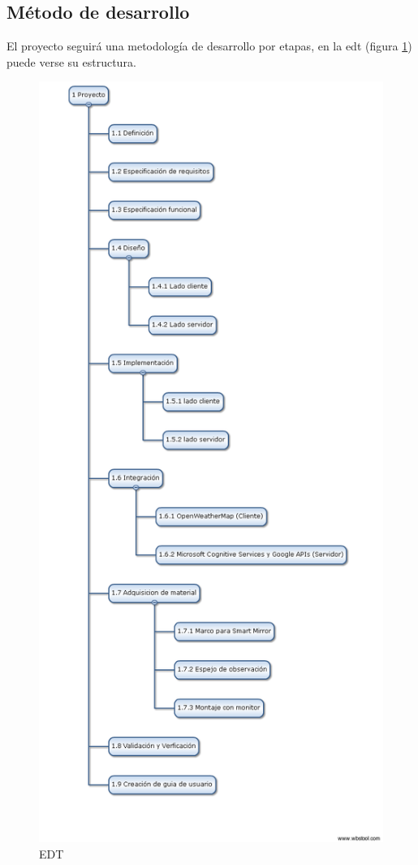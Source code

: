 \subsection{Método de desarrollo}

El proyecto seguirá una metodología de desarrollo por etapas, en la \acrfull{edt} (figura \ref{fig:edt}) puede verse su estructura.

\begin{figure}[!htp]
	\centering
	\includegraphics[angle=0, scale=.5]{fig/EDT}
	\caption{EDT}\label{fig:edt}
\end{figure}

